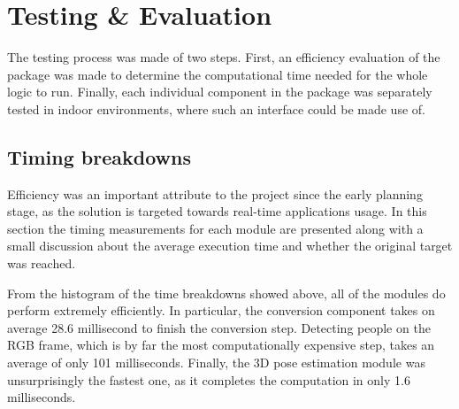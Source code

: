 \chapter{Testing \& Evaluation}
\label{chapter6}

The testing process was made of two steps. First, an efficiency evaluation of the package was made to determine the computational time needed for the whole logic to run. Finally, each individual component in the package was separately tested in indoor environments, where such an interface could be made use of.

\section{Timing breakdowns}

Efficiency was an important attribute to the project since the early planning stage, as the solution is targeted towards real-time applications usage. In this section the timing measurements for each module are presented along with a small discussion about the average execution time and whether the original target was reached.


From the histogram of the time breakdowns showed above, all of the modules do perform extremely efficiently. In particular, the conversion component takes on average 28.6 millisecond to finish the conversion step. Detecting people on the RGB frame, which is by far the most computationally expensive step, takes an average of only 101 milliseconds. Finally, the 3D pose estimation module was unsurprisingly the fastest one, as it completes the computation in only 1.6 milliseconds.

